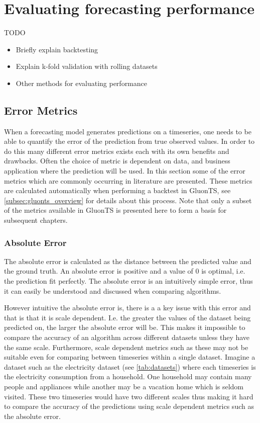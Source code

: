 \section{Evaluating forecasting performance}
TODO
\begin{itemize}
\item Briefly explain backtesting
\item Explain k-fold validation with rolling datasets
\item Other methods for evaluating performance
\end{itemize}

\subsection{Error Metrics}
\label{subsec:error_metrics}
When a forecasting model generates predictions on a timeseries, one needs to be able to quantify the error of the prediction from true observed values. In order to do this many different error metrics exists each with its own benefits and drawbacks. Often the choice of metric is dependent on data, and business application where the prediction will be used. In this section some of the error metrics which are commonly occurring in literature are presented. These metrics are calculated automatically when performing a backtest in GluonTS, see \ref{subsec:gluonts_overview} for details about this process. Note that only a subset of the metrics available in GluonTS is presented here to form a basis for subsequent chapters.

\subsubsection{Absolute Error} 
The absolute error is calculated as the distance between the predicted value and the ground truth. An absolute error is positive and a value of 0 is optimal, i.e. the prediction fit perfectly. The absolute error is an intuitively simple error, thus it can easily be understood and discussed when comparing algorithms. 

However intuitive the absolute error is, there is a a key issue with this error and that is that it is scale dependent. I.e. the greater the values of the dataset being predicted on, the larger the absolute error will be. This makes it impossible to compare the accuracy of an algorithm across different datasets unless they have the same scale. \cite{hyndman_forecasting_nodate} Furthermore, scale dependent metrics such as these may not be suitable even for comparing between timeseries within a single dataset. Imagine a dataset such as the electricity dataset (see \ref{tab:datasets}) where each timeseries is the electricity consumption from a household. One household may contain many people and appliances while another may be a vacation home which is seldom visited. These two timeseries would have two different scales thus making it hard to compare the accuracy of the predictions using scale dependent metrics such as the absolute error. 

